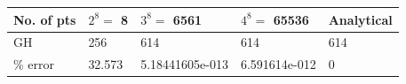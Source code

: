 \documentclass{beamer}
\begin{document}
\begin{frame}
\footnotesize
\begin{center}
  \begin{tabular}{ | l | l | l | l | l | }
    \hline
  No. of pts 					      & $2^8=$ 8 					& $3^8=$ 6561 		  & $4^8=$ 65536			 & Analytical       \\ \hline 
      GH          					&   256             & 614               & 614     	         &   614           \\ \hline
   \% error             	  &   32.573   	      & 5.18441605e-013  	& 6.591614e-012      &   0         \\ 
      \hline
  \end{tabular}
\end{center} 
\end{frame}
\end{document}
